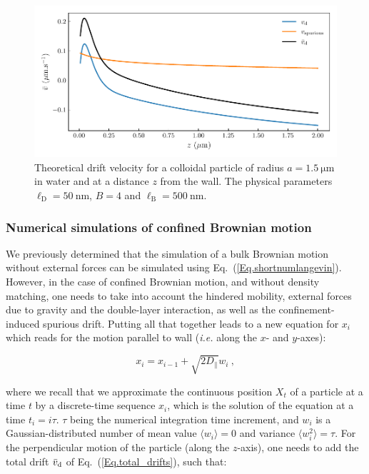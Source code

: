 \begin{figure}[ht]
	\centering
	\includegraphics{02_body/chapter3/images/spurious_drift/spurious.pdf}
	\caption{Theoretical drift velocity for a colloidal particle of radius $a = 1.5 ~\mathrm{\mu m}$ in water and at a distance $z$ from the wall. The physical parameters $\ell_\mathrm{D} = 50 ~ \mathrm{nm}$, $B = 4 $ and $\ell_\mathrm{B} = 500 ~ \mathrm{nm}$. \href{https://github.com/eXpensia/Confined-Brownian-Motion/blob/main/02_body/chapter3/images/spurious_drift/spurious_drift.ipynb}{\faGithub}} 
	\label{fig.spurious}
\end{figure}


\subsubsection{Numerical simulations of confined Brownian motion}
\label{sec:simconfined}
We previously determined that the simulation of a bulk Brownian motion without external forces can be simulated using Eq.~(\ref{Eq.shortnumlangevin}).
However, in the case of confined Brownian motion, and without density matching, one needs to take into account the hindered mobility, external forces due to gravity and the double-layer interaction, as well as the confinement-induced spurious drift. Putting all that together leads to a new equation for $x_i$ which reads for the motion parallel to wall (\textit{i.e.} along the $x$- and $y$-axes):

\begin{equation}
	x_i = x_{i-1} +  \sqrt{2D_\parallel}w_i ~,
	\label{eq.langevinnearx}
\end{equation}

where we recall that we approximate the continuous position $X_t$ of a particle at a time $t$ by a discrete-time sequence $x_i$, which is the solution of the equation at a time $t_i = i\tau$. $\tau$ being the numerical integration time increment, and $w_i$ is a Gaussian-distributed number of mean value $\langle w_i \rangle =0$ and variance $\langle w_i ^2\rangle = \tau$. For the perpendicular motion of the particle (along the $z$-axis), one needs to add the total drift $\bar{v}_\textnormal{d}$ of Eq.~(\ref{Eq.total_drifts}), such that:

